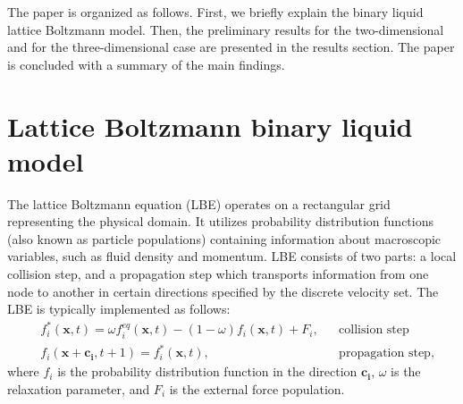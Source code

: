 \documentclass{CFD2011}
\begin{document}
The paper is organized as follows.  First, we briefly
explain the binary liquid lattice Boltzmann model. Then, the preliminary results for the
two-dimensional and for the three-dimensional case are presented in the results section. The paper
is
concluded with a summary of the main findings.

\section{Lattice Boltzmann binary liquid model}
The lattice Boltzmann equation (LBE) operates on a rectangular grid representing the
physical domain. It utilizes
probability distribution functions (also known as particle populations)
containing information about
macroscopic variables, such as fluid density and momentum. LBE consists of
two parts: a local collision step, and a propagation step which transports
information from one node to another in certain
directions specified by the discrete velocity set.
The LBE is typically implemented as follows:
\begin{equation}
\label{standard:implementation}
\begin{aligned}
&f_i^{*}(\bm{x},t)=\omega f_i^{eq}(\bm{x},t)-(1-\omega) f_i(\bm{x},t) +
F_i,&&\text{collision step}\\
&f_i(\bm{x}+\bm{c_i},t+1)=f_i^{*}(\bm{x},t),&&\text{propagation step}, 
\end{aligned}
\end{equation}
where $f_i$ is the probability distribution function in the direction $\bm{c_i}$, $\omega$ is the
relaxation parameter, and $F_i$ is the external force population. 
\end{document}
